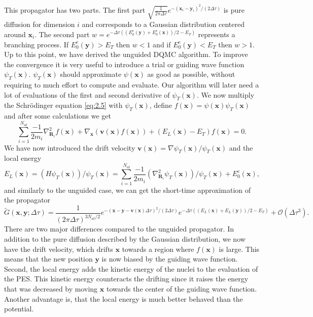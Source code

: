 \documentclass [12pt]{report}
\begin{document}
This propagator has two parts. The first part $\sqrt{\frac{1}{2 \pi \Delta \tau}} e^{-(\bm{x}_i-\bm{y}_i)^2/(2\Delta \tau)}$ is pure diffusion for dimension $i$ and corresponds to a Gaussian distribution centered around $\bm{x}_i$. The second part $w = e^{-\Delta \tau ((E_0^e(\bm{y})+E_0^e(\bm{x}))/2 - E_T)}$ represents a branching process. If $E_0^e(\bm{y}) > E_T$ then $w < 1$ and if $E_0^e(\bm{y}) < E_T$ then $w > 1$. \\
Up to this point, we have derived the unguided DQMC algorithm. To improve the convergence it is very useful to introduce a trial or guiding wave function $\psi_T(\bm{x})$. $\psi_T(\bm{x})$ should approximate $\psi(\bm{x})$ as good as possible, without requiring to much effort to compute and evaluate. Our algorithm will later need a lot of evaluations of the first and second derivative of $\psi_T(\bm{x})$. We now multiply the Schrödinger equation \eqref{eq:2.5} with $\psi_T(\bm{x})$, define $f(\bm{x}) = \psi(\bm{x}) \psi_T(\bm{x})$ and after some calculations \cite{cyrus2} we get
\begin{equation} \label{eq:2.8}
\sum_{i=1}^{N_{at}} \frac{-1}{2m_i} \nabla^2_{\bm{R}_i} f(\bm{x}) + \nabla_{\bm{x}} (\bm{v}(\bm{x}) f(\bm{x})) + (E_L(\bm{x}) - E_T)f(\bm{x}) = 0.
\end{equation}
We have now introduced the drift velocity $\bm{v}(\bm{x}) = \nabla \psi_T(\bm{x})/ \psi_T(\bm{x})$ and the local energy 
\begin{equation}\label{el}
E_L(\bm{x}) = (H\psi_T(\bm{x}))/\psi_T(\bm{x}) = \sum_{i=1}^{N_{at}} \frac{-1}{2m_i} (\nabla^2_{\bm{R}_i} \psi_T(\bm{x}))/\psi_T(\bm{x}) + E_0^e(\bm{x}),
\end{equation}
and similarly to the unguided case, we can get the short-time approximation of the propagator
\begin{equation} \label{eq:2.9}
\tilde{G}(\bm{x},\bm{y};\Delta \tau) = \frac{1}{(2 \pi \Delta \tau)^{3N_{at}/2}} e^{-(\bm{x}-\bm{y}-\bm{v}(\bm{x})\Delta \tau)^2 /(2 \Delta \tau)} e^{-\Delta \tau ((E_L(\bm{x})+E_L(\bm{y}))/2 - E_T)} + \mathcal{O}(\Delta \tau^3).
\end{equation}
There are two major differences compared to the unguided propagator. In addition to the pure diffusion described by the Gaussian distribution, we now have the drift velocity, which drifts $\bm{x}$ towards a region where $f(\bm{x})$ is large. This means that the new position $\bm{y}$ is now biased by the guiding wave function. Second, the local energy adds the kinetic energy of the nuclei to the evaluation of the PES. This kinetic energy counteracts the drifting since it raises the energy that was decreased by moving $\bm{x}$ towards the center of the guiding wave function. Another advantage is, that the local energy is much better behaved than the potential.
\end{document}

